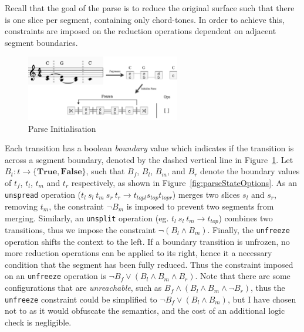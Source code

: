 \documentclass[12pt,a4paper,twoside,openany]{report} \usepackage[pdfborder={0 0 0}]{hyperref}    %
\theoremstyle{definition} \newtheorem{definition}{Definition}[section]
\begin{document}
  Recall that the goal of the parse is to reduce the original surface such that there is one slice per segment,
  containing only chord-tones. In order to achieve this, constraints are imposed on the reduction operations dependent
  on adjacent segment boundaries. 

  \begin{figure}[ht] \centering \includegraphics[width=0.6\textwidth]{impl/parseInit.png} \caption{Parse Initialisation}
  \label{fig:parseInit} \end{figure}

  Each transition has a boolean \textit{boundary} value which indicates if the transition is across a segment boundary,
  denoted by the dashed vertical line in Figure~\ref{fig:parseInit}. Let $B_t : t \to \{\textbf{True},
  \textbf{False}\}$, such that $B_f$, $B_l$, $B_m$, and $B_r$ denote the boundary values of $t_f$, $t_l$, $t_m$ and
  $t_r$ respectively, as shown in Figure~\ref{fig:parseStateOptions}. As an \texttt{unspread} operation ($t_l~s_l~t_m~s_r~t_r \to t_{topl} s_{top} t_{topr} $) merges
  two slices $s_l$ and $s_r$, removing $t_m$, the constraint $\lnot B_m$ is imposed to prevent two segments from
  merging. Similarly, an \texttt{unsplit} operation (eg. $t_l~s_l~t_m \to t_{top}$) combines two transitions, thus we
  impose the constraint $\lnot (B_l \wedge B_m)$. Finally, the \texttt{unfreeze} operation shifts the context to the
  left. If a boundary transition is unfrozen, no more reduction operations can be applied to its right, hence it
  a necessary condition that the segment has been fully reduced. Thus the constraint imposed on an \texttt{unfreeze}
  operation is $\lnot B_f \vee (B_l \wedge B_m \wedge B_r)$. Note that there are some configurations that are
  \textit{unreachable}, such as $B_f \wedge (B_l \wedge B_m \wedge \lnot B_r)$, thus the \texttt{unfreeze} constraint
  could be simplified to $\lnot B_f \vee (B_l \wedge B_m)$, but I have chosen not to as it would obfuscate the
  semantics, and the cost of an additional logic check is negligible. 
\end{document}
